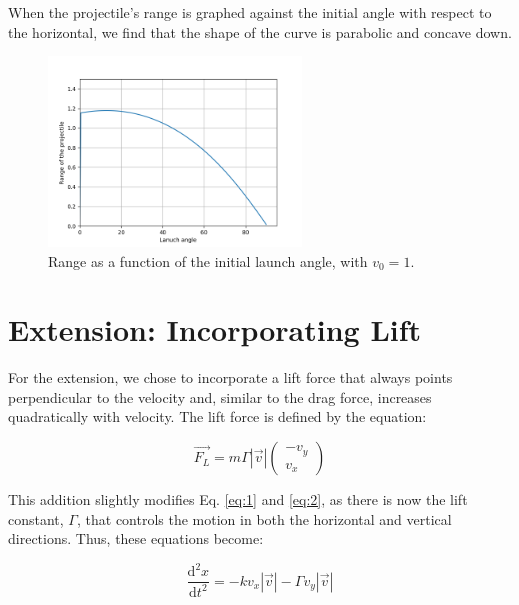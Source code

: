 \documentclass[12pt]{iopart} %
\begin{document}
When the projectile's range is graphed against the initial angle with respect to the horizontal, we find that the shape of the curve is parabolic and concave down.

\begin{figure}[h!tbp]
  \begin{center}
 \item[]\includegraphics[width=0.6\textwidth]{figure7.png}
  \caption{\label{fig:figure7}
  Range as a function of the initial launch angle, with $v_0 = 1$.
  }
  \end{center}
\end{figure}


\pagebreak

\section{Extension: Incorporating Lift}

For the extension, we chose to incorporate a lift force that always points perpendicular to the velocity and, similar to the drag force, increases quadratically with velocity.
The lift force is defined by the equation:

\begin{equation} \label{eq:3}
  \vec{F_{L}} = m \Gamma |\vec{v}|
  \begin{pmatrix}
    -v_{y} \\
    v_{x}
  \end{pmatrix}

\end{equation}

This addition slightly modifies Eq. \ref{eq:1} and \ref{eq:2}, as there is now the lift constant, $\Gamma$, that controls the motion in both the horizontal and vertical directions.
Thus, these equations become:

\begin{equation} \label{eq:4}
  \frac{\mathrm{d}^2 x}{\mathrm{d}t^2} = -k v_x |\vec{v}| - \Gamma v_y |\vec{v}|
\end{equation}
\end{document}

